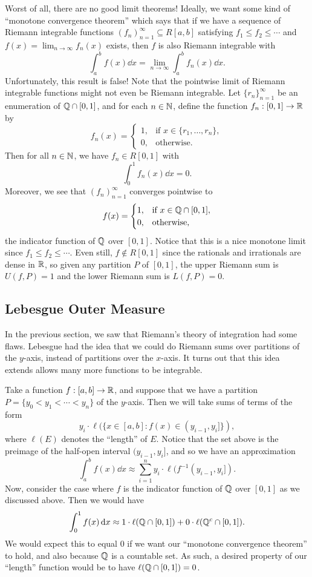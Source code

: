 Worst of all, there are no good limit theorems! Ideally, we want some kind of 
``monotone convergence theorem'' which says that if we have a sequence of 
Riemann integrable functions $(f_n)_{n=1}^\infty \subseteq R[a, b]$ satisfying 
$f_1 \leq f_2 \leq \cdots$ and $f(x) = 
\lim_{n\to\infty} f_n(x)$ exists, then $f$ is also Riemann integrable with 
\[ \int_a^b f(x)\dd x = \lim_{n\to\infty} \int_a^b f_n(x)\dd x. \] 
Unfortunately, this result is false! Note that the pointwise limit of Riemann 
integrable functions might not even be Riemann integrable. Let 
$\{r_n\}_{n=1}^\infty$ be an enumeration of $\mathbb{Q} \cap [0, 1]$, and for each 
$n \in \mathbb{N}$, define the function $f_n : [0, 1] \to \mathbb{R}$ by 
\[ f_n(x) = \begin{cases}
    1, & \text{if } x \in \{r_1, \dots, r_n\}, \\ 
    0, & \text{otherwise.} 
\end{cases} \] 
Then for all $n \in \mathbb{N}$, we have $f_n \in R[0, 1]$ with 
\[ \int_0^1 f_n(x)\dd x = 0. \] 
Moreover, we see that $(f_n)_{n=1}^\infty$ converges pointwise to 
\[ f(x) = \begin{cases} 
    1, & \text{if } x \in \mathbb{Q} \cap [0, 1], \\ 
    0, & \text{otherwise,} 
\end{cases} \] 
the indicator function of $\mathbb{Q}$ over $[0, 1]$. Notice that this is a nice 
monotone limit since $f_1 \leq f_2 \leq \cdots$. Even still, $f \notin R[0, 1]$
since the rationals and irrationals are dense in $\mathbb{R}$, so given any 
partition $P$ of $[0, 1]$, the upper Riemann sum is $U(f, P) = 1$ and 
the lower Riemann sum is $L(f, P) = 0$. 

\subsection{Lebesgue Outer Measure}\label{subsec:2.2}
In the previous section, we saw that Riemann's theory of integration had 
some flaws. Lebesgue had the idea that we could do Riemann sums over 
partitions of the $y$-axis, instead of partitions over the $x$-axis. It turns 
out that this idea extends allows many more functions to be integrable. 

Take a function $f : [a, b] \to \mathbb{R}$, and suppose that we have a partition 
$P = \{y_0 < y_1 < \cdots < y_n\}$ of the $y$-axis. Then we will take sums of 
terms of the form 
\[ y_i \cdot \ell(\{x \in [a, b] : f(x) \in (y_{i-1}, y_i]\}), \] 
where $\ell(E)$ denotes the ``length'' of $E$. Notice that the set above 
is the preimage of the half-open interval $(y_{i-1}, y_i]$, and so we have an 
approximation 
\[ \int_a^b f(x)\dd x \approx \sum_{i=1}^n y_i \cdot \ell(f^{-1}(y_{i-1}, y_i]). \] 
Now, consider the case where $f$ is the indicator function of $\mathbb{Q}$ over 
$[0, 1]$ as we discussed above. Then we would have 
\[ \int_0^1 f(x)\,\mathrm{d} x \approx 1 \cdot \ell(\mathbb{Q} \cap [0, 1]) + 0 \cdot 
\ell(\mathbb{Q}^c \cap [0, 1]). \] 
We would expect this to equal $0$ if we want our ``monotone convergence theorem''
to hold, and also because $\mathbb{Q}$ is a countable set. As such, a desired property 
of our ``length'' function would be to have $\ell(\mathbb{Q} \cap [0, 1]) = 0$. 


